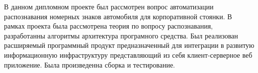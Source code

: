
В данном дипломном проекте был рассмотрен вопрос автоматизации распознавания номерных знаков автомобиля для корпоративной стоянки. В рамках проекта была рассмотрена теория по вопросу распознавания, разработанны алгоритмы архитектура програмного средства. Был реализован расширяемый программный продукт предназначенный для интеграции в развитую информационную инфраструктуру представляющий из себя клиент-серверное веб приложение. Была произведенна сборка и тестирование.
